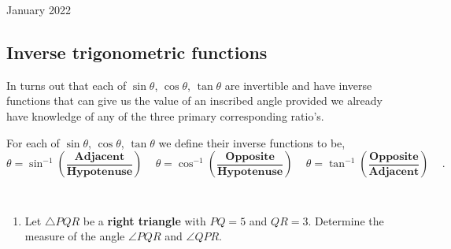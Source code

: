 \documentclass[12pt,oneside]{book} %
\begin{document}
\begin{lec}{January 2022}
  \subsection{Inverse trigonometric functions}
  In turns out that each of $\sin \theta$, $\cos \theta$, $\tan \theta$ are invertible and have inverse functions that
  can give us the value of an inscribed angle provided we already have knowledge of any of the three primary corresponding
  ratio's.

  \begin{defn}
    For each of $\sin \theta$, $\cos \theta$, $\tan \theta$ we define their inverse functions to be,
    \[
          \theta =  \sin^{-1}\left(\frac{\textbf{Adjacent}}{\textbf{Hypotenuse}}\right)\,\,\,\,\,\,\,
          \theta =\cos^{-1} \left(\frac{\textbf{Opposite}}{\textbf{Hypotenuse}}\right)\,\,\,\,\,\,\,
          \theta = \tan^{-1}\left( \frac{\textbf{Opposite}}{\textbf{Adjacent}}\right)\,\,\,\,\,\,\,
    .\] 
  \end{defn}

  \newpage

  \begin{ex} \texttt{  }
    \begin{enumerate}[label=(\alph*)]
      \item Let $\triangle PQR$ be a \textbf{right triangle} with $PQ = 5$ and $QR = 3$. Determine
        the measure of the angle $\angle PQR$ and $\angle QPR$.
      \begin{center}
\end{center}
\end{enumerate}
\end{ex}
\end{lec}
\end{document}
